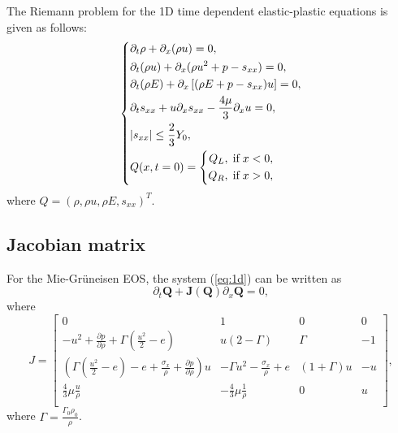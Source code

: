 \documentclass[review]{elsarticle}
\begin{document}
The Riemann problem for the 1D time dependent elastic-plastic equations is given as follows:
 \begin{equation}\label{eq:1d}
   \left\{ \begin{aligned}
       & \partial _t \rho +\partial_x(\rho u)=0,\\
       & \partial _t (\rho u)+\partial_x(\rho u^2 + p -s_{xx})=0,\\
       &\partial _t (\rho E)+\partial_x\left[(\rho E + p -s_{xx})u\right]=0,\\
       &\partial _t s_{xx}+u\partial_xs_{xx}-\frac{4\mu}{3}\partial_x u=0,\\
& |s_{xx}|\leq \frac{2}{3}Y_{0}, \\
       &Q(x,t = 0) = \left\{\begin{aligned}
           Q_L, \hspace{0.1cm} \text{if} \hspace{0.1cm} x < 0, \\
           Q_R, \hspace{0.1cm} \text{if} \hspace{0.1cm} x > 0, \\
       \end{aligned}\right.
     \end{aligned}
  \right.
\end{equation}
where $Q = (\rho, \rho u, \rho E, s_{xx})^T$.

\subsection{Jacobian matrix} %
For the Mie-Gr\"uneisen EOS, the system (\ref{eq:1d}) can be written as
\begin{equation}
 \partial_t \mathbf{Q} +\mathbf{J}(\mathbf{{Q}})\partial_x\mathbf{Q} = 0,
\end{equation}
where
\begin{equation}\label{eq:Jcb}
  J = \left[\begin{array}{llll}
      0 & 1 & 0 & 0 \\
      -u^2 + \frac{\partial p}{\partial \rho} +\Gamma(\frac{u^2}{2}-e)& u(2-\Gamma)& \Gamma & -1 \\
      (\Gamma(\frac{u^2}{2}-e)-e+\frac{\sigma_x}{\rho}+\frac{\partial p}{\partial \rho})u & -\Gamma u^2 -\frac{\sigma_x}{\rho} +e & (1+\Gamma)u& -u\\
    \frac{4}{3}\mu\frac{u}{\rho} & -\frac{4}{3}\mu\frac{1}{\rho}& 0 & u \\
\end{array}
\right],
\end{equation}
where $\Gamma = \frac{\Gamma_0\rho_0}{\rho} $.
\end{document}

